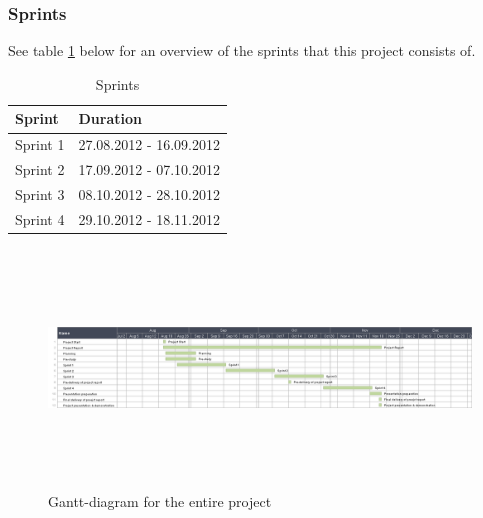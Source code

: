 \subsubsection*{Sprints}
See table \ref{tab:sprints} below for an overview of the sprints that this project consists of.
\begin{table}[h!]
\begin{center}
\begin{tabular}{l|l} \hline
\textbf{Sprint} & \textbf{Duration} \\ \hline \hline
Sprint 1 &  27.08.2012 - 16.09.2012\\
Sprint 2 & 17.09.2012 - 07.10.2012\\
Sprint 3 & 08.10.2012 - 28.10.2012\\
Sprint 4 & 29.10.2012 - 18.11.2012\\ \hline
\end{tabular}
\end{center}
\caption{Sprints} \label{tab:sprints}
\end{table}

\begin{figure}[htb]
\begin{center}
\includegraphics[width=\textwidth, height=2.5in]{foo}
\caption{Gantt-diagram for the entire project}
\end{center}
\end{figure}